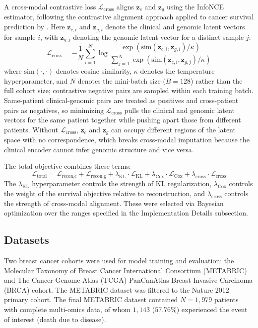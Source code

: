 \documentclass[final,3p,times,authoryear]{elsarticle}
\newcommand{\LreconC}{\mathcal{L}_{\text{recon,c}}}
\newcommand{\LreconG}{\mathcal{L}_{\text{recon,g}}}
\newcommand{\LKL}{\mathcal{L}_{\text{KL}}}
\newcommand{\LCox}{\mathcal{L}_{\text{Cox}}}
\newcommand{\Lcross}{\mathcal{L}_{\text{cross}}}
\newcommand{\Ltotal}{\mathcal{L}_{\text{total}}}
\begin{document}
A cross-modal contrastive loss $\Lcross$ aligns $\mathbf{z}_c$ and $\mathbf{z}_g$ using the InfoNCE estimator, following the contrastive alignment approach applied to cancer survival prediction by \citet{li2025cpathomic}. Here $\mathbf{z}_{c,i}$ and $\mathbf{z}_{g,i}$ denote the clinical and genomic latent vectors for sample $i$, with $\mathbf{z}_{g,j}$ denoting the genomic latent vector for a distinct sample $j$:
\begin{equation}
\Lcross = -\frac{1}{N} \sum_{i=1}^N \log \frac{\exp(\text{sim}(\mathbf{z}_{c,i}, \mathbf{z}_{g,i}) / \kappa)}{\sum_{j=1}^N \exp(\text{sim}(\mathbf{z}_{c,i}, \mathbf{z}_{g,j}) / \kappa)}
\label{eq:infonce}
\end{equation}
where $\text{sim}(\cdot,\cdot)$ denotes cosine similarity, $\kappa$ denotes the temperature hyperparameter, and $N$ denotes the mini-batch size ($B = 128$) rather than the full cohort size; contrastive negative pairs are sampled within each training batch. Same-patient clinical-genomic pairs are treated as positives and cross-patient pairs as negatives, so minimizing $\Lcross$ pulls the clinical and genomic latent vectors for the same patient together while pushing apart those from different patients. Without $\Lcross$, $\mathbf{z}_c$ and $\mathbf{z}_g$ can occupy different regions of the latent space with no correspondence, which breaks cross-modal imputation because the clinical encoder cannot infer genomic structure and vice versa.

The total objective combines these terms:
\begin{equation}
\Ltotal = \LreconC + \LreconG + \lambda_{\text{KL}} \cdot \LKL + \lambda_{\text{Cox}} \cdot \LCox + \lambda_{\text{cross}} \cdot \Lcross
\label{eq:total}
\end{equation}
The $\lambda_{\text{KL}}$ hyperparameter controls the strength of KL regularization, $\lambda_{\text{Cox}}$ controls the weight of the survival objective relative to reconstruction, and $\lambda_{\text{cross}}$ controls the strength of cross-modal alignment. These were selected via Bayesian optimization over the ranges specified in the Implementation Details subsection.

\subsection{Datasets}
Two breast cancer cohorts were used for model training and evaluation: the Molecular Taxonomy of Breast Cancer International Consortium (METABRIC) \citep{curtis2012genomic} and The Cancer Genome Atlas (TCGA) PanCanAtlas Breast Invasive Carcinoma (BRCA) cohort. The METABRIC dataset was filtered to the Nature 2012 primary cohort. The final METABRIC dataset contained $N = 1{,}979$ patients with complete multi-omics data, of whom $1{,}143$ ($57.76\%$) experienced the event of interest (death due to disease). 
\end{document}
